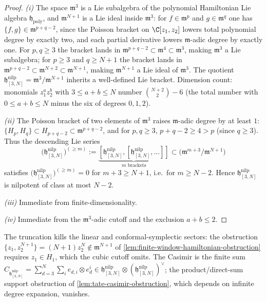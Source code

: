 \begin{proof}
\emph{(i)} The space $\mathfrak m^3$ is a Lie subalgebra of the
polynomial Hamiltonian Lie algebra $\mathfrak h_{\mathrm{poly}}$, and
$\mathfrak m^{N+1}$ is a Lie ideal inside $\mathfrak m^3$: for
$f\in\mathfrak m^p$ and
$g\in\mathfrak m^q$ one has $\{f,g\}\in\mathfrak m^{p+q-2}$, since the
Poisson bracket on $\C[z_1,z_2]$ lowers total polynomial degree by
exactly two, and each partial derivative lowers $\mathfrak m$-adic
degree by exactly one. For $p,q\geq 3$ the bracket lands in
$\mathfrak m^{p+q-2}\subset\mathfrak m^4\subset\mathfrak m^3$, making
$\mathfrak m^3$ a Lie subalgebra; for $p\geq 3$ and $q\geq N+1$
the bracket lands in $\mathfrak m^{p+q-2}\subset\mathfrak m^{N+2}
\subset\mathfrak m^{N+1}$, making $\mathfrak m^{N+1}$ a Lie ideal of
$\mathfrak m^3$. The quotient
$\mathfrak h^{\mathrm{nilp}}_{[3,N]}=\mathfrak m^3/\mathfrak m^{N+1}$ inherits a
well-defined Lie bracket. Dimension count: monomials $z_1^az_2^b$
with $3\leq a+b\leq N$ number $\binom{N+2}{2}-6$ (the total number
with $0\leq a+b\leq N$ minus the six of degrees $0,1,2$).

\emph{(ii)} The Poisson bracket of two elements of
$\mathfrak m^3$ raises $\mathfrak m$-adic degree by at least $1$:
$\{H_p,H_q\}\subset H_{p+q-2}\subset\mathfrak m^{p+q-2}$, and for
$p,q\geq 3$, $p+q-2\geq 4>p$ (since $q\geq 3$). Thus the descending
Lie series
$$\bigl(\mathfrak h^{\mathrm{nilp}}_{[3,N]}\bigr)^{(\geq m)}:=
  \underbrace{[\mathfrak h^{\mathrm{nilp}}_{[3,N]},[\mathfrak h^{\mathrm{nilp}}_{[3,N]},\ldots]]}_{m\text{ brackets}}
  \subset\bigl(\mathfrak m^{m+3}/\mathfrak m^{N+1}\bigr)$$
satisfies $\bigl(\mathfrak h^{\mathrm{nilp}}_{[3,N]}\bigr)^{(\geq m)}=0$ for
$m+3\geq N+1$, i.e.\ for $m\geq N-2$. Hence $\mathfrak h^{\mathrm{nilp}}_{[3,N]}$
is nilpotent of class at most $N-2$.

\emph{(iii)} Immediate from finite-dimensionality.

\emph{(iv)} Immediate from the $\mathfrak m^3$-adic cutoff and the
exclusion $a+b\leq 2$.
\end{proof}

The truncation kills the linear and conformal-symplectic sectors:
the obstruction
$\{z_1,z_2^{N+1}\}=(N+1)z_2^N\notin\mathfrak m^{N+1}$ of
\ref{lem:finite-window-hamiltonian-obstruction} requires $z_1\in H_1$,
which the cubic cutoff omits.  The Casimir is the finite sum
$C_{\mathfrak h^{\mathrm{nilp}}_{[3,N]}}=\sum_{d=3}^N\sum_i e_{d,i}\otimes e_d^i\in
\mathfrak h^{\mathrm{nilp}}_{[3,N]}\otimes(\mathfrak h^{\mathrm{nilp}}_{[3,N]})^\vee$; the
product/direct-sum support obstruction of
\ref{lem:tate-casimir-obstruction}, which depends on infinite degree
expansion, vanishes.


